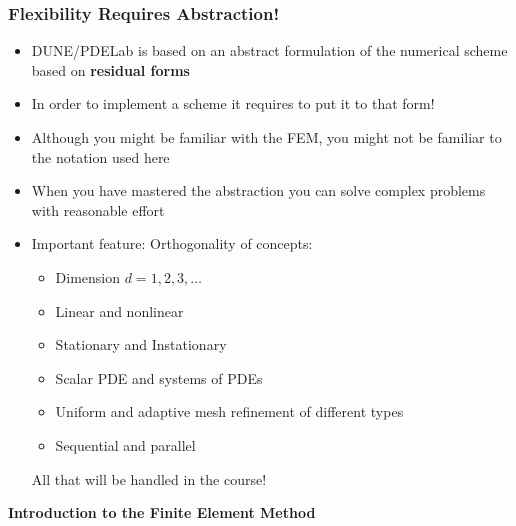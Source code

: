\documentclass[ignorenonframetext,11pt]{beamer}
\theoremstyle{definition}
\begin{document}
\begin{frame}
\frametitle{Flexibility Requires Abstraction!}
\begin{itemize}
\item DUNE/PDELab is based on an abstract formulation of the numerical scheme
based on \textbf{residual forms}
\item In order to implement a scheme it requires to put it to that form!
\item Although you might be familiar with the FEM, you might not
be familiar to the notation used here
\item When you have mastered the abstraction you can solve complex problems with 
reasonable effort
\item Important feature: Orthogonality of concepts:
\begin{itemize}
\item Dimension $d=1,2,3,\ldots$
\item Linear and nonlinear
\item Stationary and Instationary
\item Scalar PDE and systems of PDEs
\item Uniform and adaptive mesh refinement of different types
\item Sequential and parallel
\end{itemize}
All that will be handled in the course!
\end{itemize}
\end{frame}

\begin{frame}
\begin{center}
\Large\textbf{Introduction to the Finite Element Method}
\end{center}
\end{frame}

\end{document}
